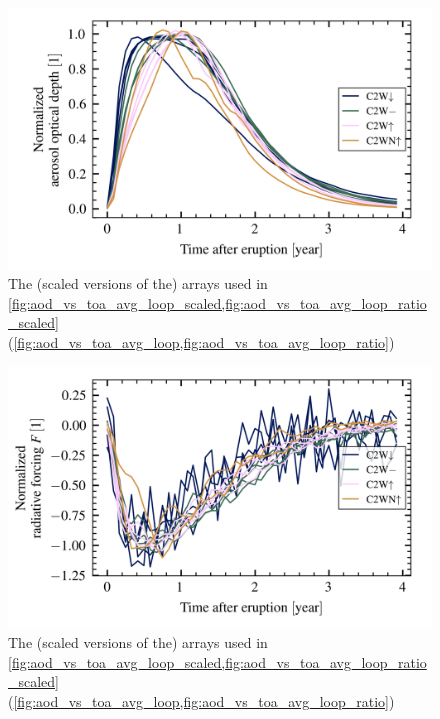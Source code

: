 \documentclass{ametsocV5}
\begin{document}
\begin{figure}[t]
  \begin{center}
    \includegraphics[width=0.95\linewidth]{figures/aod_arrays_normalized.png}
  \end{center}
  \caption{
    The (scaled versions of the) arrays used in
    \cref{fig:aod_vs_toa_avg_loop_scaled,fig:aod_vs_toa_avg_loop_ratio_scaled}
    (\cref{fig:aod_vs_toa_avg_loop,fig:aod_vs_toa_avg_loop_ratio})
  }%
  \label{fig:aod_arrays_normalized}
\end{figure}

\begin{figure}[t]
  \begin{center}
    \includegraphics[width=0.95\linewidth]{figures/toa_arrays_normalized.png}
  \end{center}
  \caption{
    The (scaled versions of the) arrays used in
    \cref{fig:aod_vs_toa_avg_loop_scaled,fig:aod_vs_toa_avg_loop_ratio_scaled}
    (\cref{fig:aod_vs_toa_avg_loop,fig:aod_vs_toa_avg_loop_ratio})
  }%
  \label{fig:toa_arrays_normalized}
\end{figure}
\end{document}

